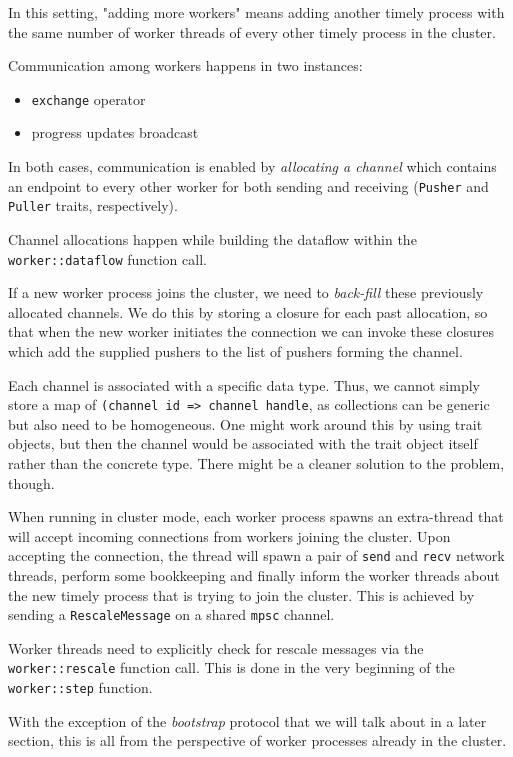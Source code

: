 \documentclass[12pt]{extarticle}
\begin{document}
In this setting, "adding more workers" means adding another timely process with the same number of worker threads
of every other timely process in the cluster.

Communication among workers happens in two instances:
\begin{itemize}
    \item \verb|exchange| operator
    \item progress updates broadcast
\end{itemize}

In both cases, communication is enabled by \textit{allocating a channel} which contains an endpoint to every other worker
for both sending and receiving (\verb|Pusher| and \verb|Puller| traits, respectively).

Channel allocations happen while building the dataflow within the \verb|worker::dataflow| function call.

If a new worker process joins the cluster, we need to \textit{back-fill} these previously allocated channels.
We do this by storing a closure for each past allocation, so that when the new worker initiates the connection
we can invoke these closures which add the supplied pushers to the list of pushers forming the channel.

Each channel is associated with a specific data type.
Thus, we cannot simply store a map of \verb|(channel id => channel handle|, as collections can be generic but also need to be homogeneous.
One might work around this by using trait objects, but then the channel would be associated with the trait object itself rather than the concrete
type. There might be a cleaner solution to the problem, though.


\vspace{3mm}
\noindent
When running in cluster mode, each worker process spawns an extra-thread that will accept incoming connections from workers joining the cluster.
Upon accepting the connection, the thread will spawn a pair of \verb|send| and \verb|recv| network threads, perform some bookkeeping and
finally inform the worker threads about the new timely process that is trying to join the cluster.
This is achieved by sending a \verb|RescaleMessage| on a shared \verb|mpsc| channel.

Worker threads need to explicitly check for rescale messages via the \verb|worker::rescale| function call.
This is done in the very beginning of the \verb|worker::step| function.

With the exception of the \textit{bootstrap} protocol that we will talk about in a later section,
this is all from the perspective of worker processes already in the cluster.
\end{document}
